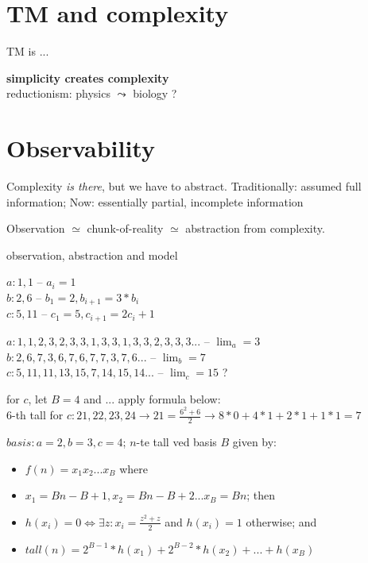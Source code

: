 \documentclass[10pt]{article}
\begin{document}
\section{TM and complexity}
\begin{enu}
\item TM is ...
\item {\bf simplicity creates complexity}\\
reductionism: physics $\leadsto$ biology ?
\end{enu}

\section{Observability}\label{se:obs}

\begin{enu}
\item Complexity {\em is there}, but we have to abstract. Traditionally:
assumed full information; Now: essentially partial, incomplete information
\item Observation $\simeq$
chunk-of-reality $\simeq$ abstraction from complexity.
\item\label{obs} observation, abstraction and model
\begin{enu}
\item $a:1,1$ -- $a_i=1$\\
 $b:2,6$ -- $b_1=2, b_{i+1}=3*b_i$\\
 $c:5,11$ --  $c_1=5,c_{i+1}=2c_i+1$
\item $a:1,1,2,3,2,3,3,1,3,3,1,3,3,2,3,3,3...$ -- $\lim_a=3$\\
$b:2,6,7,3,6,7,6,7,7,3,7,6...$ --  $\lim_b=7$\\
 $c:5,11,11,13,15,7,14,15,14...$ -- $\lim_c=15$ ?
\item for $c$, let $B=4$ and ... apply formula below: \\
6-th tall for $c:21,22,23,24 \to 21=\frac{6^2+6}{2} \to 8*0+4*1+2*1+1*1=7$
\item $basis:a=2, b=3, c=4$; $n$-te tall ved basis $B$ given by:
\begin{itemize}
\item $f(n)=x_1x_2...x_B$ where
\item $x_1=Bn-B+1,x_2=Bn-B+2...x_B=Bn$; then 
\item $h(x_i)=0\iff\exists z:x_i=\frac{z^2+z}{2}$ and $h(x_i)=1$ otherwise; and 
\item $tall(n)= 2^{B-1}*h(x_1)+2^{B-2}*h(x_2)+...+h(x_B)$
\end{itemize}

\end{enu}
\end{enu}
\end{document}
